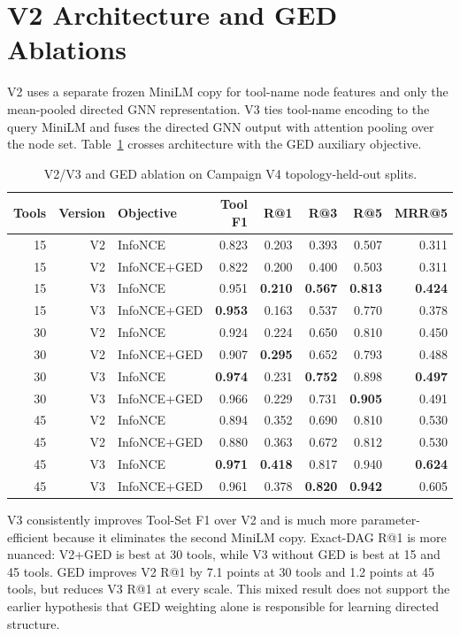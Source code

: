 \documentclass{article}
\begin{document}
\section{V2 Architecture and GED Ablations}
\label{sec:architecture-ablation}

V2 uses a separate frozen MiniLM copy for tool-name node features and only the mean-pooled directed GNN representation. V3 ties tool-name encoding to the query MiniLM and fuses the directed GNN output with attention pooling over the node set. Table~\ref{tab:v2_v3_ablation} crosses architecture with the GED auxiliary objective.

\begin{table}[h]
\caption{V2/V3 and GED ablation on Campaign V4 topology-held-out splits.}
\label{tab:v2_v3_ablation}
\centering
\scriptsize
\begin{tabular}{@{}rrlrrrrr@{}}
\toprule
Tools & Version & Objective & Tool F1 & R@1 & R@3 & R@5 & MRR@5 \\
\midrule
15 & V2 & InfoNCE       & 0.823 & 0.203 & 0.393 & 0.507 & 0.311 \\
15 & V2 & InfoNCE+GED   & 0.822 & 0.200 & 0.400 & 0.503 & 0.311 \\
15 & V3 & InfoNCE       & 0.951 & \textbf{0.210} & \textbf{0.567} & \textbf{0.813} & \textbf{0.424} \\
15 & V3 & InfoNCE+GED   & \textbf{0.953} & 0.163 & 0.537 & 0.770 & 0.378 \\
\midrule
30 & V2 & InfoNCE       & 0.924 & 0.224 & 0.650 & 0.810 & 0.450 \\
30 & V2 & InfoNCE+GED   & 0.907 & \textbf{0.295} & 0.652 & 0.793 & 0.488 \\
30 & V3 & InfoNCE       & \textbf{0.974} & 0.231 & \textbf{0.752} & 0.898 & \textbf{0.497} \\
30 & V3 & InfoNCE+GED   & 0.966 & 0.229 & 0.731 & \textbf{0.905} & 0.491 \\
\midrule
45 & V2 & InfoNCE       & 0.894 & 0.352 & 0.690 & 0.810 & 0.530 \\
45 & V2 & InfoNCE+GED   & 0.880 & 0.363 & 0.672 & 0.812 & 0.530 \\
45 & V3 & InfoNCE       & \textbf{0.971} & \textbf{0.418} & 0.817 & 0.940 & \textbf{0.624} \\
45 & V3 & InfoNCE+GED   & 0.961 & 0.378 & \textbf{0.820} & \textbf{0.942} & 0.605 \\
\bottomrule
\end{tabular}
\end{table}

V3 consistently improves Tool-Set F1 over V2 and is much more parameter-efficient because it eliminates the second MiniLM copy. Exact-DAG R@1 is more nuanced: V2+GED is best at 30 tools, while V3 without GED is best at 15 and 45 tools. GED improves V2 R@1 by 7.1 points at 30 tools and 1.2 points at 45 tools, but reduces V3 R@1 at every scale. This mixed result does not support the earlier hypothesis that GED weighting alone is responsible for learning directed structure.
\end{document}
